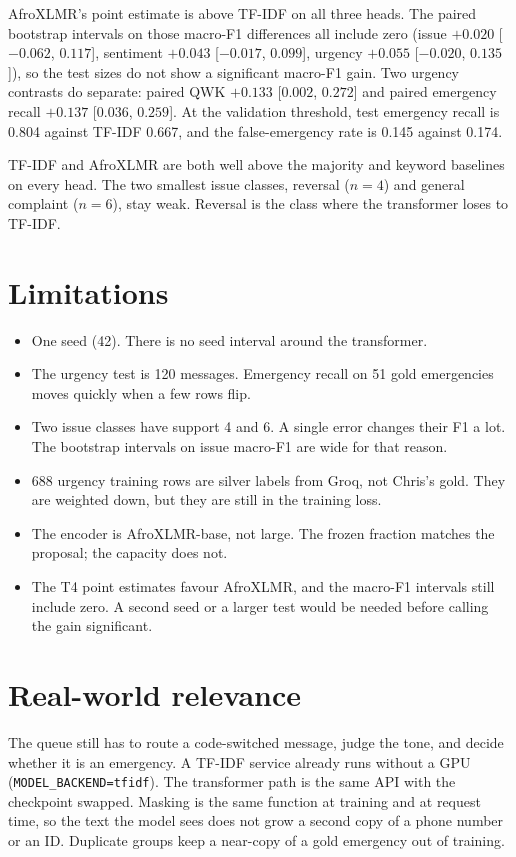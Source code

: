 \documentclass[11pt,a4paper]{article}
\begin{document}
AfroXLMR's point estimate is above TF-IDF on all three heads. The paired bootstrap intervals on those macro-F1 differences all include zero (issue $+0.020$ [$-0.062$, $0.117$], sentiment $+0.043$ [$-0.017$, $0.099$], urgency $+0.055$ [$-0.020$, $0.135$]), so the test sizes do not show a significant macro-F1 gain. Two urgency contrasts do separate: paired QWK $+0.133$ [$0.002$, $0.272$] and paired emergency recall $+0.137$ [$0.036$, $0.259$]. At the validation threshold, test emergency recall is 0.804 against TF-IDF 0.667, and the false-emergency rate is 0.145 against 0.174.

TF-IDF and AfroXLMR are both well above the majority and keyword baselines on every head. The two smallest issue classes, reversal ($n = 4$) and general complaint ($n = 6$), stay weak. Reversal is the class where the transformer loses to TF-IDF.

\section{Limitations}

\begin{itemize}
  \item One seed (42). There is no seed interval around the transformer.
  \item The urgency test is 120 messages. Emergency recall on 51 gold emergencies moves quickly when a few rows flip.
  \item Two issue classes have support 4 and 6. A single error changes their F1 a lot. The bootstrap intervals on issue macro-F1 are wide for that reason.
  \item 688 urgency training rows are silver labels from Groq, not Chris's gold. They are weighted down, but they are still in the training loss.
  \item The encoder is AfroXLMR-base, not large. The frozen fraction matches the proposal; the capacity does not.
  \item The T4 point estimates favour AfroXLMR, and the macro-F1 intervals still include zero. A second seed or a larger test would be needed before calling the gain significant.
\end{itemize}

\section{Real-world relevance}

The queue still has to route a code-switched message, judge the tone, and decide whether it is an emergency. A TF-IDF service already runs without a GPU (\texttt{MODEL\_\allowbreak{}BACKEND=tfidf}). The transformer path is the same API with the checkpoint swapped. Masking is the same function at training and at request time, so the text the model sees does not grow a second copy of a phone number or an ID. Duplicate groups keep a near-copy of a gold emergency out of training.
\end{document}
